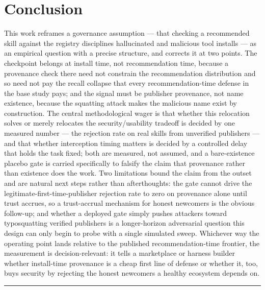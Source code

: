 \documentclass[11pt]{article}
\begin{document}
\section{Conclusion}

This work reframes a governance assumption --- that checking a recommended skill against the registry disciplines hallucinated and malicious tool installs --- as an empirical question with a precise structure, and corrects it at two points. The checkpoint belongs at install time, not recommendation time, because a provenance check there need not constrain the recommendation distribution and so need not pay the recall collapse that every recommendation-time defense in the base study pays; and the signal must be publisher provenance, not name existence, because the squatting attack makes the malicious name exist by construction. The central methodological wager is that whether this relocation solves or merely relocates the security/usability tradeoff is decided by one measured number --- the rejection rate on real skills from unverified publishers --- and that whether interception timing matters is decided by a controlled delay that holds the task fixed; both are measured, not assumed, and a bare-existence placebo gate is carried specifically to falsify the claim that provenance rather than existence does the work. Two limitations bound the claim from the outset and are natural next steps rather than afterthoughts: the gate cannot drive the legitimate-first-time-publisher rejection rate to zero on provenance alone until trust accrues, so a trust-accrual mechanism for honest newcomers is the obvious follow-up; and whether a deployed gate simply pushes attackers toward typosquatting verified publishers is a longer-horizon adversarial question this design can only begin to probe with a single simulated sweep. Whichever way the operating point lands relative to the published recommendation-time frontier, the measurement is decision-relevant: it tells a marketplace or harness builder whether install-time provenance is a cheap first line of defense or whether it, too, buys security by rejecting the honest newcomers a healthy ecosystem depends on.




\vspace{1em}
\hrule
\vspace{1em}
\end{document}
